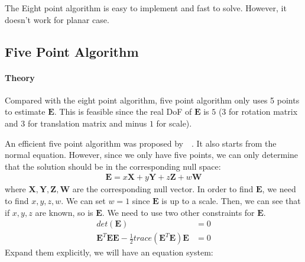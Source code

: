 \documentclass[a4paper]{report}
\begin{document}
The Eight point algorithm is easy to implement and fast to solve. However, it doesn't work for planar case.

\subsection{Five Point Algorithm}
\paragraph{Theory}
Compared with the eight point algorithm, five point algorithm only uses 5 points to estimate $\mathbf{E}$. This is feasible since the real DoF of $\mathbf{E}$ is $5$ ($3$ for rotation matrix and $3$ for translation matrix and minus $1$ for scale).

An efficient five point algorithm was proposed by~\cite{nister2003efficient}~\cite{nister2004efficient}. It also starts from the normal equation. However, since  we only have five points, we can only determine that the solution should be in the corresponding null space:
\begin{align*}
	\mathbf{E}=x\mathbf{X}+y\mathbf{Y}+z\mathbf{Z}+w\mathbf{W}
\end{align*}
where $\mathbf{X,Y,Z,W}$ are the corresponding null vector. In order to find $\mathbf{E}$, we need to find $x,y,z,w$. We can set $w=1$ since $\mathbf{E}$ is up to a scale. Then, we can see that if $x,y,z$ are known, so is $\mathbf{E}$. We need to use two other constraints for $\mathbf{E}$.
\begin{align*}
	det(\mathbf{E})&=0 \\
	\mathbf{E}^T\mathbf{E}\mathbf{E}-\frac{1}{2}trace(\mathbf{E}^T\mathbf{E})\mathbf{E}&=0
\end{align*}
Expand them explicitly, we will have an equation system:
\end{document}
